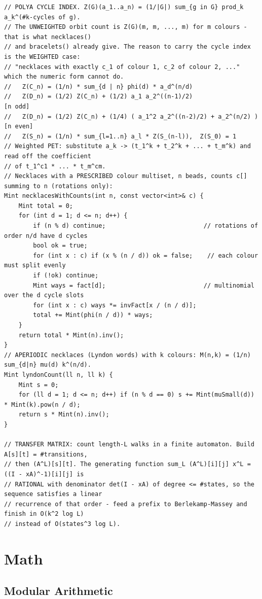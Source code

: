 \documentclass[9pt,a4paper,twocolumn]{extarticle}
\begin{document}
\begin{lstlisting}
// POLYA CYCLE INDEX. Z(G)(a_1..a_n) = (1/|G|) sum_{g in G} prod_k a_k^(#k-cycles of g).
// The UNWEIGHTED orbit count is Z(G)(m, m, ..., m) for m colours - that is what necklaces()
// and bracelets() already give. The reason to carry the cycle index is the WEIGHTED case:
// "necklaces with exactly c_1 of colour 1, c_2 of colour 2, ..." which the numeric form cannot do.
//   Z(C_n) = (1/n) * sum_{d | n} phi(d) * a_d^(n/d)
//   Z(D_n) = (1/2) Z(C_n) + (1/2) a_1 a_2^((n-1)/2)                    [n odd]
//   Z(D_n) = (1/2) Z(C_n) + (1/4) ( a_1^2 a_2^((n-2)/2) + a_2^(n/2) )  [n even]
//   Z(S_n) = (1/n) * sum_{l=1..n} a_l * Z(S_(n-l)),  Z(S_0) = 1
// Weighted PET: substitute a_k -> (t_1^k + t_2^k + ... + t_m^k) and read off the coefficient
// of t_1^c1 * ... * t_m^cm.
// Necklaces with a PRESCRIBED colour multiset, n beads, counts c[] summing to n (rotations only):
Mint necklacesWithCounts(int n, const vector<int>& c) {
    Mint total = 0;
    for (int d = 1; d <= n; d++) {
        if (n % d) continue;                           // rotations of order n/d have d cycles
        bool ok = true;
        for (int x : c) if (x % (n / d)) ok = false;    // each colour must split evenly
        if (!ok) continue;
        Mint ways = fact[d];                           // multinomial over the d cycle slots
        for (int x : c) ways *= invFact[x / (n / d)];
        total += Mint(phi(n / d)) * ways;
    }
    return total * Mint(n).inv();
}
// APERIODIC necklaces (Lyndon words) with k colours: M(n,k) = (1/n) sum_{d|n} mu(d) k^(n/d).
Mint lyndonCount(ll n, ll k) {
    Mint s = 0;
    for (ll d = 1; d <= n; d++) if (n % d == 0) s += Mint(muSmall(d)) * Mint(k).pow(n / d);
    return s * Mint(n).inv();
}

// TRANSFER MATRIX: count length-L walks in a finite automaton. Build A[s][t] = #transitions,
// then (A^L)[s][t]. The generating function sum_L (A^L)[i][j] x^L = ((I - xA)^-1)[i][j] is
// RATIONAL with denominator det(I - xA) of degree <= #states, so the sequence satisfies a linear
// recurrence of that order - feed a prefix to Berlekamp-Massey and finish in O(k^2 log L)
// instead of O(states^3 log L).
\end{lstlisting}

\section{Math}

\subsection{Modular Arithmetic}
\end{document}
